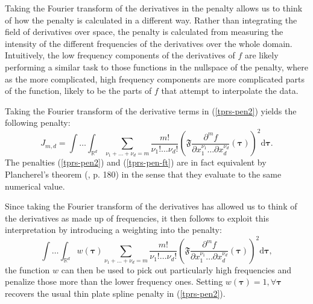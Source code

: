 Taking the Fourier transform of the derivatives in the penalty allows us to think of how the penalty is calculated in a different way. Rather than integrating the field of derivatives over space, the penalty is calculated from measuring the intensity of the different frequencies of the derivatives over the whole domain. Intuitively, the low frequency components of the derivatives of $f$ are likely performing a similar task to those functions in the nullspace of the penalty, where as the more complicated, high frequency components are more complicated parts of the function, likely to be the parts of $f$ that attempt to interpolate the data.

Taking the Fourier transform of the derivative terms in (\ref{tprs-pen2}) yields the following penalty:
\begin{equation}
J_{m,d} = \int \ldots \int_{\mathbb{R}^d} \sum_{\nu_1 + \dots + \nu_d=m} \frac{m!}{\nu_1! \dots \nu_d!} \left ( \mathfrak{F} \frac{\partial^m f}{\partial x_1^{\nu_1} \ldots  \partial x_d^{\nu_d}} \left (  \boldsymbol{\tau}\right ) \right )^2 \text{d} \boldsymbol{\tau}.
\label{tprs-pen-ft}
\end{equation}
The penalties (\ref{tprs-pen2}) and (\ref{tprs-pen-ft}) are in fact equivalent by Plancherel's theorem (\cite{vretblad}, p. 180) in the sense that they evaluate to the same numerical value.

Since taking the Fourier transform of the derivatives has allowed us to think of the derivatives as made up of frequencies, it then follows to exploit this interpretation by introducing a weighting into the penalty: 
\begin{equation}
\int \ldots \int_{\mathbb{R}^d} w(\boldsymbol{\tau}) \sum_{\nu_1 + \dots + \nu_d=m} \frac{m!}{\nu_1! \dots \nu_d!} \left ( \mathfrak{F} \frac{\partial^m f}{\partial x_1^{\nu_1} \ldots  \partial x_d^{\nu_d}} \left (\boldsymbol{\tau} \right ) \right )^2 \text{d} \boldsymbol{\tau},
\label{duchon-penalty-general}
\end{equation}
the function $w$ can then be used to pick out particularly high frequencies and penalize those more than the lower frequency ones. Setting $w(\boldsymbol{\tau})=1, \forall \boldsymbol{\tau}$ recovers the usual thin plate spline penalty in (\ref{tprs-pen2}).

